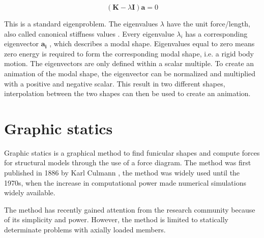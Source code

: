 \begin{equation*}
(\mathbf{K} - \lambda \mathbf{I})\mathbf{a} = 0
\end{equation*}

This is a standard eigenproblem. The eigenvalues   $\lambda$ have the unit force/length, also called canonical stiffness values \cite{Olsson2006}. Every eigenvalue  $\lambda_i$ has a corresponding eigenvector   $\mathbf{a_i}$ , which describes a modal shape. Eigenvalues equal to zero means zero energy is required to form the corresponding modal shape, i.e. a rigid body motion. The eigenvectors are only defined within a scalar multiple. To create an animation of the modal shape, the eigenvector can be normalized and multiplied with a positive and negative scalar. This result in two different shapes, interpolation between the two shapes can then be used to create an animation.


\section{Graphic statics}
Graphic statics is a graphical method to find funicular shapes and compute forces for structural models through the use of a force diagram. The method was first published in 1886 by Karl Culmann \cite{Culmann1866}, the method was widely used until the 1970s, when the increase in computational power made numerical simulations widely available. 

The method has recently gained attention from the research community \cite{Todisco2015, Block, Fivet2013} because of its simplicity and power. However, the method is limited to statically determinate problems with axially loaded members. 
